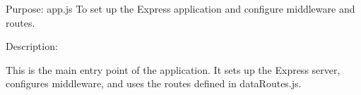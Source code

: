 Purpose:
app.js
To set up the Express application and configure middleware and routes.

Description:

This is the main entry point of the application. It sets up the Express server,
configures middleware, and uses the routes defined in dataRoutes.js.
